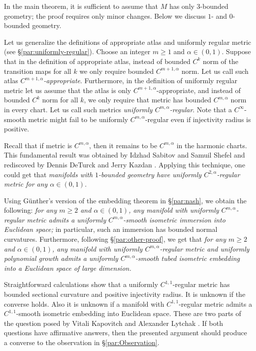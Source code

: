 \arxiv{\documentclass[a4paper,10pt]{article}}{\documentclass{mjm}}
\begin{document}
In the main theorem, it is sufficient to assume that $M$ has only $3$-bounded geometry;
the proof requires only minor changes.
Below we discuss $1$- and $0$-bounded geometry.

Let us generalize the definitions of appropriate atlas and uniformly regular metric (see §\ref{par:uniformly-regular}).
Choose an integer $m\ge 1$ and $\alpha\in(0,1)$.
Suppose that in the definition of appropriate atlas,
instead of bounded $C^k$ norm of the transition maps for all $k$ 
we only require bounded $C^{m+1,\alpha}$ norm.
Let us call such atlas \emph{$C^{m+1,\alpha}$-appropriate}.
Furthermore, in the definition of uniformly regular metric let us assume that the atlas is only $C^{m+1,\alpha}$-appropriate, and instead of bounded $C^k$ norm for all $k$,
we only require that metric has bounded $C^{m,\alpha}$ norm in every chart.
Let us call such metrics \emph{uniformly $C^{m,\alpha}$-regular}.
Note that a $C^\infty$-smooth metric might fail to be uniformly $C^{m,\alpha}$-regular even if injectivity radius is positive.

Recall that if metric is $C^{m,\alpha}$, then it remains to be $C^{m,\alpha}$ in the harmonic charts.
This fundamental result was obtained by Idzhad Sabitov and Samuil Shefel \cite{sabitov-shefel} and rediscoved by Dennis DeTurck and Jerry Kazdan \cite{deturck-kazdan}.
Applying this technique, one could get that \textit{manifolds with $1$-bounded geometry have uniformly $C^{2,\alpha}$-regular metric for any $\alpha\in (0,1)$}.

Using Günther's version of the embedding theorem \cite{guenther} in §\ref{par:nash},
we obtain the following: \textit{for any $m\ge 2$ and $\alpha\in(0,1)$, any manifold with uniformly $C^{m,\alpha}$-regular metric admits a uniformly $C^{m,\alpha}$-smooth isometric immersion into Euclidean space;}
in particular, such an immersion has bounded normal curvatures.
Furthermore, following §\ref{par:other-proof}, we get that
\textit{for any $m\ge 2$ and $\alpha\in(0,1)$, any manifold with uniformly $C^{m,\alpha}$-regular metric and uniformly polynomial growth admits a uniformly $C^{m,\alpha}$-smooth tubed isometric embedding into a Euclidean space of large dimension.}

Straightforward calculations show that a uniformly $C^{1,1}$-regular metric has bounded sectional curvature and positive injectivity radius.
It is unknown if the converse holds.
Also it is unknown if a manifold with $C^{1,1}$-regular metric admits a $C^{1,1}$-smooth isometric embedding into Euclidean space.
These are two parts of the question posed by Vitali Kapovitch and Alexander Lytchak \cite[1.10]{kapovitch-lytchak}.
If both questions have affirmative answers, then the presented argument should produce a converse to the observation in §\ref{par:Observation}.
\end{document}
